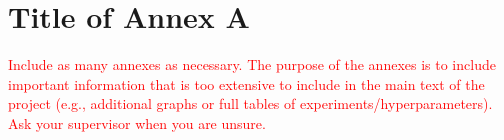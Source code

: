 \documentclass[12pt]{extarticle}
\numberwithin{equation}{section}
\begin{document}
\newpage

\appendix

\section{Title of Annex A}
\textcolor{red}{Include as many annexes as necessary. The purpose of the annexes is to include important information that is too extensive to include in the main text of the project (e.g., additional graphs or full tables of experiments/hyperparameters). Ask your supervisor when you are unsure.}
\end{document}

